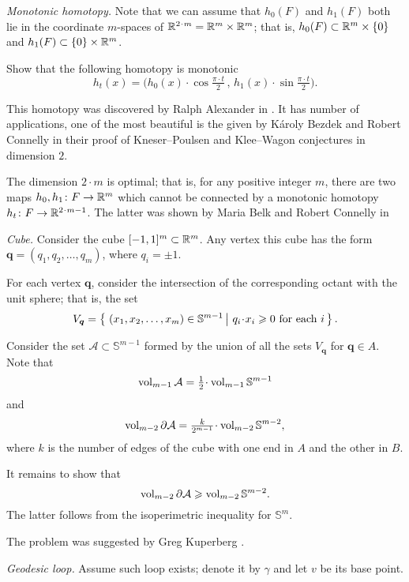 \textit{Monotonic homotopy.}
Note that we can assume
that $h_0(F)$ and $h_1(F)$ both lie in the coordinate $m$-spaces of $\RR^{2\cdot m}=\RR^m\times \RR^m$;
that is,
$h_0(F)\z\subset\RR^m\times\{0\}$
and $h_1(F)\subset  \{0\}\times\mathbb{R}^m$.

Show that the following homotopy is monotonic
\[h_t(x)=\bigl(h_0(x)\cdot \cos\tfrac{\pi\cdot t}2
\,,\,
 h_1(x)\cdot\sin\tfrac{\pi\cdot t}{2}\bigr).\] 


This homotopy was discovered by Ralph Alexander in \cite{ralexander}.
It has number of applications, 
one of the most beautiful is the given 
by K\'aroly Bezdek 
and Robert Connelly \cite{bezdek-connelly} 
in their proof of 
Kneser--Poulsen  
and Klee--Wagon conjectures in dimension $2$.

The dimension $2\cdot m$ is optimal;
that is, for any positive integer $m$,
there are two maps $h_0,h_1\colon F\to \mathbb{R}^m$ which cannot be connected by a monotonic homotopy $h_t\:F\to\RR^{2\cdot m-1}$.
The latter was shown by Maria Belk and Robert Connelly in \cite{belk-connelly}



\textit{Cube.}
Consider the cube $[-1,1]^m\subset \mathbb{R}^m$.
Any vertex this cube has the form $\bm{q}=(q_1,q_2,\dots,q_m)$,
where  $q_i=\pm1$.

For each vertex $\bm{q}$,
consider the intersection of the corresponding octant with the unit sphere;
that is, the set
\[V_{\bm{q}}=\set{(x_1,x_2,\dots,x_m)\in\mathbb{S}^{m-1}}{q_i\cdot x_i\ge 0\ \text{for each}\ i}.\]

Consider the set $\mathcal{A}\subset\mathbb{S}^{m-1}$
formed by the union of all the sets $V_{\bm{q}}$ for $\bm{q}\in A$.
Note that 
\[\vol_{m-1}\mathcal{A}=\tfrac12\cdot\vol_{m-1}\mathbb{S}^{m-1}\]
and 
\[\vol_{m-2}\partial\mathcal{A}
=
\tfrac k{2^{m-1}}\cdot\vol_{m-2}\mathbb{S}^{m-2},\]
where $k$ is the number of edges of the cube with one end in $A$ and the other in $B$.

It remains to  show that 
\[\operatorname{\rm vol}_{m-2}\partial\mathcal{A}
\geqslant \operatorname{\rm vol}_{m-2}\mathbb{S}^{m-2}.\]
The latter follows from the isoperimetric inequality for $\mathbb{S}^m$. 

The problem was suggested by Greg Kuperberg \cite[see][]{One-step}.

\textit{Geodesic loop.}
Assume such loop exists; denote it by $\gamma$ and let $v$ be its base point.

